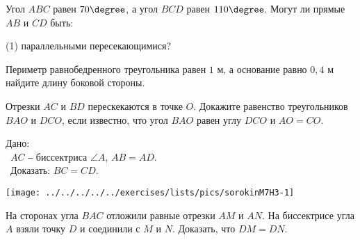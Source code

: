 \begin{homework}[number=3]
	\begin{listofex}
		\item  Угол \( ABC\) равен \( 70\degree \), а угол \( BCD \) равен \( 110\degree \). Могут ли прямые \( AB \) и \( CD \) быть:
		\begin{tasks}(1)
			\task[a)] параллельными
			\task[б)] пересекающимися?
		\end{tasks}
		\item Периметр равнобедренного треугольника равен \( 1 \) м, а основание равно \( 0,4 \) м найдите длину боковой стороны.
		\item Отрезки \( AC \) и \( BD \) перескекаются в точке \( O \). Докажите равенство треугольников \( BAO \) и \( DCO \), если известно, что угол \( BAO \) равен углу \( DCO \) и \( AO=CO \).
		\item 
		\begin{minipage}[t]{\bodywidth}
			Дано: \\\ \( AC \) ‒ биссектриса \( \angle A \), \( AB=AD \).\\\ Доказать: \( BC = CD \).
		\end{minipage}
		\hspace{0.02\linewidth}
		\begin{minipage}[t]{\picwidth}
			\texttt{[image: ../../../../../exercises/lists/pics/sorokinM7H3-1]}
		\end{minipage}
		\item На сторонах угла \( BAC \) отложили равные отрезки \( AM \) и \( AN \). На биссектрисе угла \( A \) взяли точку \( D \) и соединили с \( M \) и \( N \). Доказать, что \( DM=DN \).
	\end{listofex}
\end{homework}

